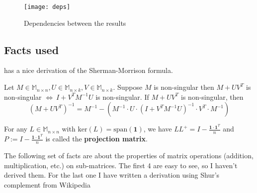 \begin{figure}[h!]

\begin{center}
\texttt{[image: deps]} 
\end{center}
\caption{Dependencies between the results}
 
\end{figure}

\subsection{Facts used}

\citet{ttao} has a nice derivation of the Sherman-Morrison formula. 

\begin{HXf}
 Let $ M \in \mathbb{M}_{n \times n} , U \in \mathbb{M}_{n \times k}, V \in \mathbb{M}_{n \times k}$. Suppose $M$ is non-singular then $M + UV^T$ is non-singular $\iff \ I + V^T M^{-1} U$ is non-singular. If $M + UV^T$ is non-singular, then 
 $$ (M + UV^T)^{-1} = M^{-1} - \left( M^{-1} \cdot U \cdot (I + V^TM^{-1}U)^{-1} \cdot V^T \cdot M^{-1}\right) $$
\end{HXf}


\begin{HXf}
 For any $L \in \mathbb{M}_{n \times n}$ with $\text{ker}(L) = \text{span}(\textbf{1})$, we have $LL^+ = I - \frac{\textbf{1} \cdot \textbf{1}^T}{n}$ and $P := I - \frac{\textbf{1} \cdot \textbf{1}^T}{n}$ is called the \textbf{projection matrix}. 
\end{HXf}

The following set of facts are about the properties of matrix operations (addition, multiplication, etc.) on sub-matrices. The first 4 are easy to see, so I haven't derived them. For the last one I have written a derivation using Shur's complement from Wikipedia

